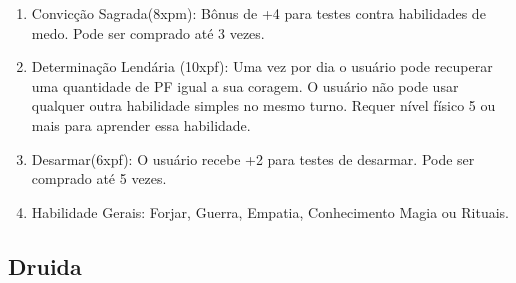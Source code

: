 \begin{enumerate}
 	\item Convicção Sagrada(8xpm): Bônus de +4 para testes contra habilidades de medo. Pode ser comprado até 3 vezes.

\item Determinação Lendária (10xpf): Uma vez por dia o usuário pode recuperar uma quantidade de PF igual a sua coragem. O usuário não pode usar qualquer outra habilidade simples no mesmo turno. Requer nível físico 5 ou mais para aprender essa habilidade. 

 	\item Desarmar(6xpf): O usuário recebe +2 para testes de desarmar. Pode ser comprado até 5 vezes.
  
	\item Habilidade Gerais: Forjar, Guerra, Empatia, Conhecimento Magia ou Rituais.
 

\end{enumerate}
 
 
  \subsection{Druida}  
  

